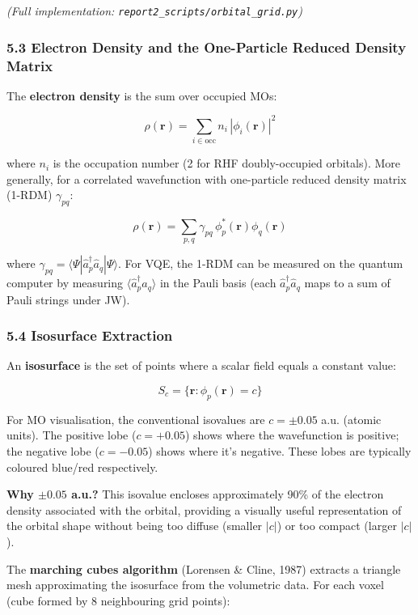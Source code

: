 \documentclass[
  11pt,
]{report}
\begin{document}
\emph{(Full implementation: \texttt{report2\_scripts/orbital\_grid.py})}

\subsubsection{5.3 Electron Density and the One-Particle Reduced Density
Matrix}\label{electron-density-and-the-one-particle-reduced-density-matrix}

The \textbf{electron density} is the sum over occupied MOs:

\[\rho(\mathbf{r}) = \sum_{i \in \text{occ}} n_i\, |\phi_i(\mathbf{r})|^2\]

where \(n_i\) is the occupation number (2 for RHF doubly-occupied
orbitals). More generally, for a correlated wavefunction with
one-particle reduced density matrix (1-RDM) \(\gamma_{pq}\):

\[\rho(\mathbf{r}) = \sum_{p,q} \gamma_{pq}\, \phi_p^*(\mathbf{r})\phi_q(\mathbf{r})\]

where
\(\gamma_{pq} = \langle\Psi|\hat{a}_p^\dagger\hat{a}_q|\Psi\rangle\).
For VQE, the 1-RDM can be measured on the quantum computer by measuring
\(\langle\hat{a}_p^\dagger\hat{a}_q\rangle\) in the Pauli basis (each
\(\hat{a}_p^\dagger\hat{a}_q\) maps to a sum of Pauli strings under JW).

\subsubsection{5.4 Isosurface Extraction}\label{isosurface-extraction}

An \textbf{isosurface} is the set of points where a scalar field equals
a constant value:

\[S_c = \{\mathbf{r} : \phi_p(\mathbf{r}) = c\}\]

For MO visualisation, the conventional isovalues are \(c = \pm 0.05\)
a.u. (atomic units). The positive lobe (\(c = +0.05\)) shows where the
wavefunction is positive; the negative lobe (\(c = -0.05\)) shows where
it's negative. These lobes are typically coloured blue/red respectively.

\textbf{Why \(\pm 0.05\) a.u.?} This isovalue encloses approximately
90\% of the electron density associated with the orbital, providing a
visually useful representation of the orbital shape without being too
diffuse (smaller \(|c|\)) or too compact (larger \(|c|\)).

The \textbf{marching cubes algorithm} (Lorensen \& Cline, 1987) extracts
a triangle mesh approximating the isosurface from the volumetric data.
For each voxel (cube formed by 8 neighbouring grid points):
\end{document}
